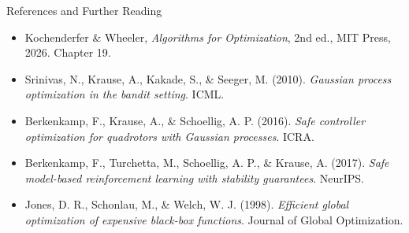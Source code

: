 \documentclass[aspectratio=169,10pt]{beamer}
\begin{document}
\begin{frame}{References and Further Reading}
  \begin{itemize}
    \item Kochenderfer \& Wheeler, \textit{Algorithms for Optimization},
          2nd ed., MIT Press, 2026. Chapter 19.
    \item Srinivas, N., Krause, A., Kakade, S., \& Seeger, M. (2010).
          \emph{Gaussian process optimization in the bandit setting}.
          ICML.
    \item Berkenkamp, F., Krause, A., \& Schoellig, A. P. (2016).
          \emph{Safe controller optimization for quadrotors with Gaussian processes}.
          ICRA.
    \item Berkenkamp, F., Turchetta, M., Schoellig, A. P., \& Krause, A.
          (2017). \emph{Safe model-based reinforcement learning with stability guarantees}.
          NeurIPS.
    \item Jones, D. R., Schonlau, M., \& Welch, W. J. (1998).
          \emph{Efficient global optimization of expensive black-box functions}.
          Journal of Global Optimization.
  \end{itemize}
\end{frame}
\end{document}
